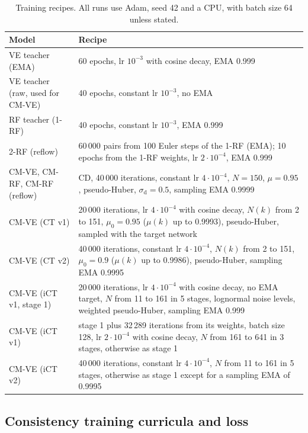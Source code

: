 \documentclass{article}
\begin{document}
\begin{table}[H]
  \caption{Training recipes. All runs use Adam, seed 42 and a CPU, with batch
  size 64 unless stated.}
  \label{tab:recipes}
  \centering
  \footnotesize
  \begin{tabular}{p{3.4cm}p{8.9cm}}
    \toprule
    Model & Recipe \\
    \midrule
    VE teacher (EMA) & 60 epochs, lr $10^{-3}$ with cosine decay, EMA 0.999 \\
    VE teacher (raw, used for CM-VE) & 40 epochs, constant lr $10^{-3}$, no EMA \\
    RF teacher (1-RF) & 40 epochs, constant lr $10^{-3}$, EMA 0.999 \\
    2-RF (reflow) & 60\,000 pairs from 100 Euler steps of the 1-RF (EMA); 10 epochs from the 1-RF weights, lr $2\cdot10^{-4}$, EMA 0.999 \\
    CM-VE, CM-RF, CM-RF (reflow) & CD, 40\,000 iterations, constant lr $4\cdot10^{-4}$, $N = 150$, $\mu = 0.95$, pseudo-Huber, $\sigma_\text{d} = 0.5$, sampling EMA 0.9999 \\
    CM-VE (CT v1) & 20\,000 iterations, lr $4\cdot10^{-4}$ with cosine decay, $N(k)$ from 2 to 151, $\mu_0 = 0.95$ ($\mu(k)$ up to 0.9993), pseudo-Huber, sampled with the target network \\
    CM-VE (CT v2) & 40\,000 iterations, constant lr $4\cdot10^{-4}$, $N(k)$ from 2 to 151, $\mu_0 = 0.9$ ($\mu(k)$ up to 0.9986), pseudo-Huber, sampling EMA 0.9995 \\
    CM-VE (iCT v1, stage 1) & 20\,000 iterations, lr $4\cdot10^{-4}$ with cosine decay, no EMA target, $N$ from 11 to 161 in 5 stages, lognormal noise levels, weighted pseudo-Huber, sampling EMA 0.999 \\
    CM-VE (iCT v1) & stage 1 plus 32\,289 iterations from its weights, batch size 128, lr $2\cdot10^{-4}$ with cosine decay, $N$ from 161 to 641 in 3 stages, otherwise as stage 1 \\
    CM-VE (iCT v2) & 40\,000 iterations, constant lr $4\cdot10^{-4}$, $N$ from 11 to 161 in 5 stages, otherwise as stage 1 except for a sampling EMA of 0.9995 \\
    \bottomrule
  \end{tabular}
\end{table}

\subsection{Consistency training curricula and loss}
\label{sec:app_ct}
\end{document}
